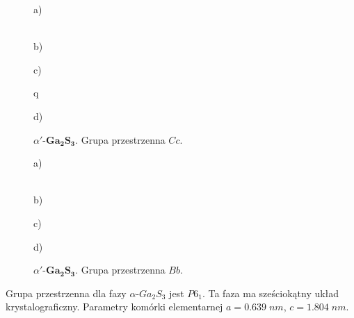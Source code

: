 \begin{figure}[H]
	\begin{minipage}[h]{0.47\linewidth}
		 a) \\
	\end{minipage}
	\hfill
	\begin{minipage}[h]{0.47\linewidth}
		 \\b)
	\end{minipage}
	\vfill
	\begin{minipage}[h]{0.47\linewidth}
		 c) \\
	\end{minipage}q
	\hfill
	\begin{minipage}[h]{0.47\linewidth}
		 d) \\
	\end{minipage}
	\caption{$\alpha'$-$\mathbf{Ga_{2}S_{3}}$. Grupa przestrzenna $Cc$.}
	\begin{minipage}[h]{0.47\linewidth}
	 a) \\
	\end{minipage}
	\hfill
	\begin{minipage}[h]{0.47\linewidth}
		 \\b)
	\end{minipage}
	\vfill
	\begin{minipage}[h]{0.47\linewidth}
		 c) \\
	\end{minipage}
	\hfill
	\begin{minipage}[h]{0.47\linewidth}
		 d) \\
	\end{minipage}
	\caption{$\alpha'$-$\mathbf{Ga_{2}S_{3}}$. Grupa przestrzenna $Bb$.}
\end{figure}

Grupa przestrzenna dla fazy $\alpha$-$Ga_{2}S_{3}$ jest $P6_1$. Ta faza ma sześciokątny układ krystalograficzny. Parametry komórki elementarnej $a=0.639\;nm$, $c=1.804\;nm$.


